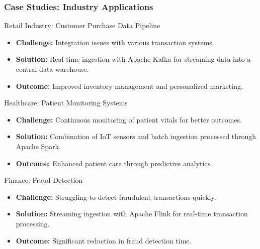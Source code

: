 \documentclass{beamer}
\begin{document}
\begin{frame}[fragile]
    \frametitle{Case Studies: Industry Applications}
    \begin{block}{Retail Industry: Customer Purchase Data Pipeline}
        \begin{itemize}
            \item \textbf{Challenge:} Integration issues with various transaction systems.
            \item \textbf{Solution:} Real-time ingestion with Apache Kafka for streaming data into a central data warehouse.
            \item \textbf{Outcome:} Improved inventory management and personalized marketing.
        \end{itemize}
    \end{block}
    
    \begin{block}{Healthcare: Patient Monitoring Systems}
        \begin{itemize}
            \item \textbf{Challenge:} Continuous monitoring of patient vitals for better outcomes.
            \item \textbf{Solution:} Combination of IoT sensors and batch ingestion processed through Apache Spark.
            \item \textbf{Outcome:} Enhanced patient care through predictive analytics.
        \end{itemize}
    \end{block}
    
    \begin{block}{Finance: Fraud Detection}
        \begin{itemize}
            \item \textbf{Challenge:} Struggling to detect fraudulent transactions quickly.
            \item \textbf{Solution:} Streaming ingestion with Apache Flink for real-time transaction processing.
            \item \textbf{Outcome:} Significant reduction in fraud detection time.
        \end{itemize}
    \end{block}
\end{frame}
\end{document}
